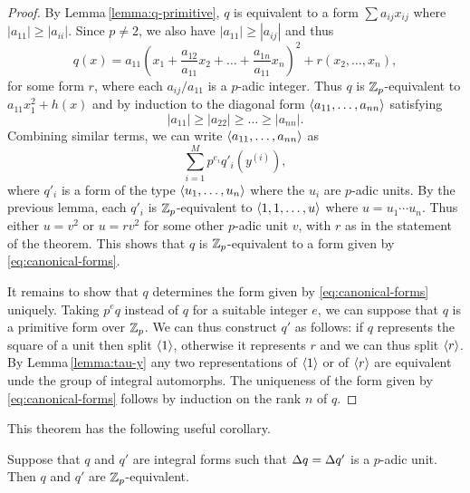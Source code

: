 \begin{proof}
    By Lemma\,\ref{lemma:q-primitive}, \(q\) is equivalent to a form \(\sum
    a_{ij}x_{ij}\) where \(|a_{11}| \geq |a_{ii}|\). Since \(p \neq 2\), we also
    have \(|a_{11}| \geq |a_{ij}|\) and thus
    \[
        q(x) = a_{11}\left(x_1 + \frac{a_{12}}{a_{11}}x_2 + \dots + \frac{a_{1n}}{a_{11}}x_n\right)^2 + r(x_2, \dots, x_n),
    \]
    for some form \(r\), where each \(a_{ij}/a_{11}\) is a \(p\)-adic integer.
    Thus \(q\) is \(\mathbb{Z}_p\)-equivalent to \(a_{11}x_1^2 + h(x)\) and by
    induction to the diagonal form \(\langle a_{11}, \dots, a_{nn} \rangle\)
    satisfying
    \[
        |a_{11}| \geq |a_{22}| \geq \dots \geq |a_{nn}|.    
    \]
    Combining similar terms, we can write \(\langle a_{11}, \dots, a_{nn} \rangle\)
    as
    \[
        \sum_{i=1}^M p^{e_i} q'_i(y^{(i)}),
    \]
    where \(q'_i\) is a form of the type \(\langle u_1, \dots, u_n \rangle\) where
    the \(u_i\) are \(p\)-adic units. By the previous lemma, each \(q'_i\) is
    \(\mathbb{Z}_p\)-equivalent to \(\langle 1, 1, \dots, u \rangle\) where \(u = u_1
    \cdots u_n\). Thus either \(u = v^2\) or \(u = rv^2\) for some other
    \(p\)-adic unit \(v\), with \(r\) as in the statement of the theorem. This
    shows that \(q\) is \(\mathbb{Z}_p\)-equivalent to a form given by
    \eqref{eq:canonical-forms}.

    It remains to show that \(q\) determines the form given by
    \eqref{eq:canonical-forms} uniquely. Taking \(p^eq\) instead of \(q\) for a
    suitable integer \(e\), we can suppose that \(q\) is a primitive form over
    \(\mathbb{Z}_p\). We can thus construct \(q'\) as follows: if \(q\)
    represents the square of a unit then split \(\langle 1 \rangle\), otherwise it
    represents \(r\) and we can thus split \(\langle r \rangle\). By
    Lemma\,\ref{lemma:tau-y} any two representations of \(\langle 1 \rangle\) or of
    \(\langle r \rangle\) are equivalent unde the group of integral automorphs. The
    uniqueness of the form given by \eqref{eq:canonical-forms} follows by
    induction on the rank \(n\) of \(q\).
\end{proof}

\medskip

This theorem has the following useful corollary.

\begin{corollary}
    Suppose that \(q\) and \(q'\) are integral forms such that \({\Delta} q =
    {\Delta} q'\) is a \(p\)-adic unit. Then \(q\) and \(q'\) are
    \(\mathbb{Z}_p\)-equivalent.
\end{corollary}


